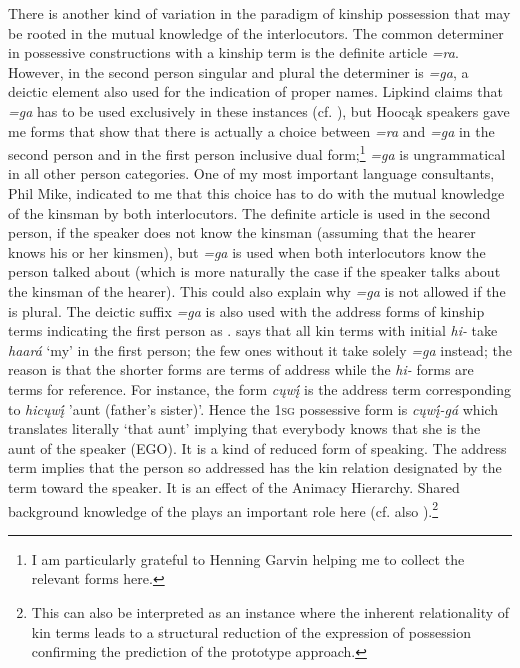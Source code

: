 \documentclass[output=paper]{LSP/langsci}
\begin{document}
There is another kind of variation in the paradigm of kinship possession that may be rooted in the mutual knowledge of the interlocutors. The common determiner in possessive constructions with a kinship term is the definite article \textit{=ra}. However, in the second person singular and plural the determiner is \textit{=ga}, a deictic element also used for the indication of proper names. Lipkind claims that \textit{=ga} has to be used exclusively in these instances (cf. \citealt[31]{Lipkind1945}), but Hoocąk speakers gave me forms that show that there is actually a choice between \textit{=ra} and \textit{=ga} in the second person and in the first person inclusive dual form;\footnote{I am particularly grateful to Henning Garvin helping me to collect the relevant forms here.} \textit{=ga} is ungrammatical in all other person categories. One of my most important language consultants, Phil Mike, indicated to me that this choice has to do with the mutual knowledge of the kinsman by both interlocutors. The definite article is used in the second person, if the speaker does not know the kinsman (assuming that the hearer knows his or her kinsmen), but \textit{=ga} is used when both interlocutors know the person talked about (which is more naturally the case if the speaker talks about the kinsman of the hearer). This could also explain why \textit{=ga} is not allowed if the  is plural. The deictic suffix \textit{=ga} is also used with the address forms of kinship terms indicating the first person as . \citet[31]{Lipkind1945} says that all kin terms with initial \textit{hi-} take \textit{haará} `my' in the first person; the few ones without it take solely \textit{=ga} instead; the reason is that the shorter forms are terms of address while the \textit{hi-} forms are terms for reference. For instance, the form \textit{cųwį́} is the address term corresponding to \textit{hicųwį́} 'aunt (father's sister)'. Hence the \textsc{1sg} possessive form is \textit{cųwį́-gá} which translates literally `that aunt' implying that everybody knows that she is the aunt of the speaker (EGO). It is a kind of reduced form of speaking. The address term implies that the person so addressed has the kin relation designated by the term toward the speaker. It is an effect of the Animacy Hierarchy. Shared background knowledge of the  plays an important role here (cf. also \citealt[26f]{Heine1997}).\footnote{This can also be interpreted as an instance where the inherent relationality of kin terms leads to a structural reduction of the expression of possession confirming the prediction of the prototype approach.}
\end{document}
